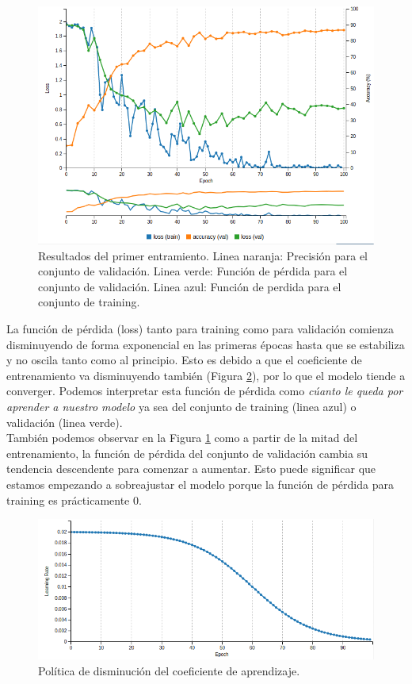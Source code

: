 \documentclass[a4paper,11pt]{book}
\begin{document}
\begin{figure}[h]
\centering
\includegraphics[width=0.9\linewidth]{imagenes/entrenamiento1results}
\caption[Resultados del entrenamiento 1]{Resultados del primer entramiento. Linea naranja: Precisión para el conjunto de validación. Linea verde: Función de pérdida para el conjunto de validación. Linea azul: Función de perdida para el conjunto de training.}
\label{fig:entrenamiento1results}
\end{figure}
La función de pérdida (loss) tanto para training como para validación comienza disminuyendo de forma exponencial en las primeras épocas hasta que se estabiliza y no oscila tanto como al principio. Esto es debido a que el coeficiente de entrenamiento va disminuyendo también (Figura \ref{fig:entrenamiento1results1}), por lo que el modelo tiende a converger. Podemos interpretar esta función de pérdida como \textit{cúanto le queda por aprender a nuestro modelo} ya sea del conjunto de training (linea azul) o validación (linea verde).\\
También podemos observar en la Figura \ref{fig:entrenamiento1results} como a partir de la mitad del entrenamiento, la función de pérdida del conjunto de validación cambia su tendencia descendente para comenzar a aumentar. Esto puede significar que estamos empezando a sobreajustar el modelo porque la función de pérdida para training es prácticamente 0.

\begin{figure}[h]
	\centering
	\includegraphics[width=0.9\linewidth]{imagenes/entrenamiento1results1}
	\caption[Resultados del entrenamiento 1]{Política de disminución del coeficiente de aprendizaje.}
	\label{fig:entrenamiento1results1}
\end{figure}
\end{document}
